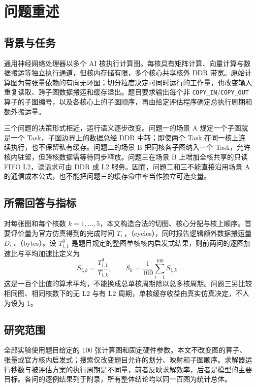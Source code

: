 \section{问题重述}
\subsection{背景与任务}
通用神经网络处理器以多个 AI 核执行计算图。每核具有矩阵计算、向量计算与数据搬运等独立执行通道，但核内存储有限，多个核心共享核外 DDR 带宽。原始计算图为带张量依赖的有向无环图；切分粒度决定可同时运行的工作量，也改变输入重复读取、跨子图数据搬运和缓存溢出。题目要求输出每个非 \texttt{COPY\_IN}/\texttt{COPY\_OUT} 算子的子图编号，以及各核心上的子图顺序，再由给定评估程序确定总执行周期和额外搬运量\cite{problem}。

三个问题的决策形式相近，运行语义逐步改变。问题一的场景 A 规定一个子图就是一个 Task，子图边界上的数据总经 DDR 中转；即使两个 Task 在同一核上连续执行，也不保留私有缓存。问题二的场景 B 把同核各子图纳入一个 Task，允许核内驻留，但跨核数据需等待同步释放。问题三在场景 B 上增加全核共享的只读 FIFO L2，读请求可由 DDR 或 L2 服务。因而，问题二和三不能直接沿用场景 A 的通信成本公式，也不能把问题三的缓存命中率当作独立可选变量。

\subsection{所需回答与指标}
对每张图和每个核数 $k=1,\ldots,5$，本文构造合法的切图、核心分配与核上顺序。首要评价量为官方仿真得到的完成时间 $T_{i,k}$（cycles），同时报告逻辑额外数据搬运量 $D_{i,k}$（bytes）。设 $T_{i,1}^{0}$ 是题目规定的整图单核核内启发式结果，则前两问的逐图加速比与平均加速比定义为
\begin{equation}\label{eq:speedup}
S_{i,k}=\frac{T_{i,1}^{0}}{T_{i,k}},\qquad
\overline S_k=\frac1{100}\sum_{i=1}^{100}S_{i,k}.
\end{equation}
这是一百个比值的算术平均，不能换成总单核周期除以总多核周期。问题三另比较相同图、相同核数下的无 L2 与有 L2 周期，单核缓存收益由真实仿真决定，不人为设为 $1$。

\subsection{研究范围}
全部实验使用题目给定的 $100$ 张计算图和固定硬件参数。本文不改变图的算子、张量或官方核内启发式；搜索仅改变题目允许的划分、映射和子图顺序。求解器运行秒数与被评估方案的执行周期是不同量，前者反映求解效率，后者是模型的主要目标。各问的逐例结果列于附录，所有整体结论均以同一百图为统计总体。
